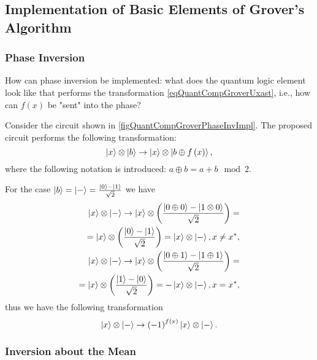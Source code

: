 \subsection{ Implementation of Basic Elements of Grover's Algorithm}

\subsubsection{Phase Inversion}
How can phase inversion be implemented: what does the quantum logic element look like that performs the transformation \eqref{eqQuantCompGroverUxast}, i.e., how can $f\left(x\right)$ be "sent" into the phase?



Consider the circuit shown in \autoref{figQuantCompGroverPhaseInvImpl}. The proposed circuit performs the following transformation:
\begin{equation}
\ket{x}\otimes\ket{b} \rightarrow 
\ket{x}\otimes\left|b\oplus f\left(x\right)\right>,
\nonumber
\end{equation}
where the following notation is introduced: $a \oplus b = a + b \mod 2$.

For the case $\ket{b} = \ket{-} = 
\frac{\ket{0} - \ket{1}}{\sqrt{2}}$ we have
\begin{eqnarray}
\ket{x}\otimes\ket{-} \rightarrow 
\ket{x}\otimes\left(\frac{\left|0\oplus 0\right> -
  \left|1\otimes 0\right>}{\sqrt{2}}\right) = 
\nonumber \\
= \ket{x}\otimes\left(\frac{\ket{0} -
  \ket{1}}{\sqrt{2}}\right) =
\ket{x}\otimes\ket{-}
, x \ne x^{\ast},
\nonumber \\
\ket{x}\otimes\ket{-} \rightarrow 
\ket{x}\otimes\left(\frac{\left|0\oplus 1\right> -
  \left|1\oplus 1\right>}{\sqrt{2}}\right) = 
\nonumber \\
= \ket{x}\otimes\left(\frac{\ket{1} -
  \ket{0}}{\sqrt{2}}\right) =
- \ket{x}\otimes\ket{-}
, x = x^{\ast},
\nonumber
\end{eqnarray}
thus we have the following transformation
\begin{equation}
\ket{x}\otimes\ket{-} \rightarrow 
\left(-1\right)^{f\left(x\right)}\ket{x}\otimes\ket{-}.
\label{eqQuantCompGroverPhaseInvImpl}
\end{equation}

\subsubsection{Inversion about the Mean}

